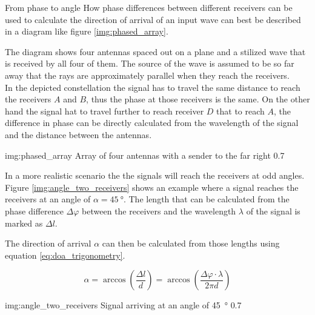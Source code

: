 \begin{subchapter}{From phase to angle}
  How phase differences between different receivers
  can be used to calculate the direction of arrival of an
  input wave can best be described in a diagram like
  figure \ref{img:phased_array}.

  The diagram shows four antennas spaced out on a plane
  and a stilized wave that is received by all four of them.
  The source of the wave is assumed to be so far away that
  the rays are approximately parallel when they reach the receivers. \\

  In the depicted constellation the signal has to travel the
  same distance to reach the receivers $A$ and $B$, thus the
  phase at those receivers is the same.
  On the other hand the signal hat to travel further to reach
  receiver $D$ that to reach $A$, the difference in phase can
  be directly calculated from the wavelength of the signal and
  the distance between the antennas.

               {img:phased_array}
               {Array of four antennas with a sender to the far right}
               {0.7}

  In a more realistic scenario the the signals will reach the
  receivers at odd angles. Figure \ref{img:angle_two_receivers}
  shows an example where a signal reaches the receivers at an
  angle of $\alpha=\SI{45}{\degree}$. The length that can be calculated
  from the phase difference $\Delta \varphi$ between the receivers and
  the wavelength $\lambda$ of the signal is marked as $\Delta l$.

  The direction of arrival $\alpha$ can then be calculated from
  those lengths using equation \ref{eq:doa_trigonometry}.

  \begin{equation}
    \label{eq:doa_trigonometry}
    \alpha
    = \arccos \left( \frac{\Delta l}{d} \right)
    = \arccos \left( \frac{\Delta \varphi \cdot \lambda}{2 \pi d} \right)
  \end{equation}

               {img:angle_two_receivers}
               {Signal arriving at an angle of \SI{45}{\degree}}
               {0.7}
\end{subchapter}

